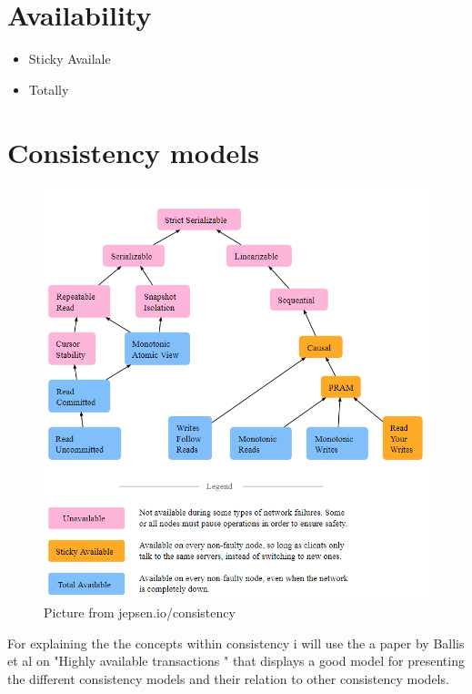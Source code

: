 \documentclass[a4paper,10pt,titlepage]{report}
\begin{document}
\section{Availability}

\begin{itemize}
\item Sticky Availale
\item Totally

\end{itemize}

\newpage
\section{Consistency models}


\begin{figure}
    \centering
       \includegraphics[scale=0.4]{images/consistency models.PNG}
     \caption{Picture from jepsen.io/consistency}
     \label{fig:jepsenioconsistency}
\end{figure}


For explaining the the concepts within consistency i will use the a paper by Ballis et al on "Highly available transactions "\cite{10.14778/2732232.2732237} that displays a good model for presenting the different consistency models and their relation to other consistency models.\\
\end{document}
